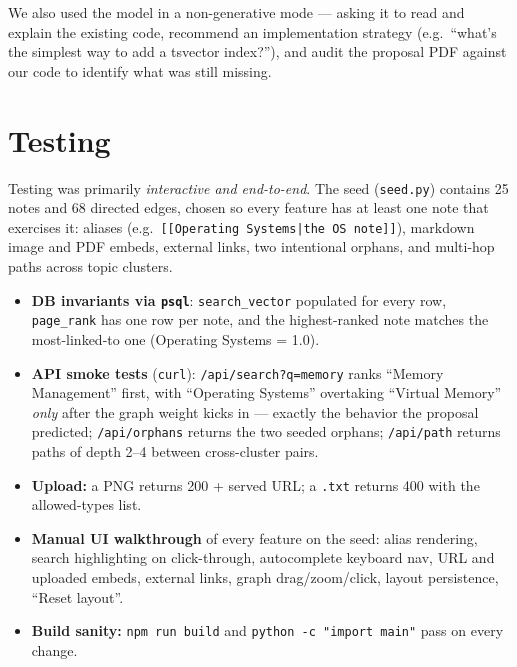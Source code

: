 \documentclass[11pt,a4paper]{article}
\begin{document}
We also used the model in a non-generative mode --- asking it to read and explain the existing code, recommend an implementation strategy (e.g.\ ``what's the simplest way to add a tsvector index?''), and audit the proposal PDF against our code to identify what was still missing.

\section{Testing}

Testing was primarily \emph{interactive and end-to-end}. The seed (\texttt{seed.py}) contains 25 notes and 68 directed edges, chosen so every feature has at least one note that exercises it: aliases (e.g.\ \texttt{[[Operating Systems|the OS note]]}), markdown image and PDF embeds, external links, two intentional orphans, and multi-hop paths across topic clusters.

\begin{itemize}[leftmargin=1.2em,itemsep=1pt,topsep=2pt]
\item \textbf{DB invariants via \texttt{psql}}: \texttt{search\_vector} populated for every row, \texttt{page\_rank} has one row per note, and the highest-ranked note matches the most-linked-to one (Operating Systems = 1.0).
\item \textbf{API smoke tests} (\texttt{curl}): \texttt{/api/search?q=memory} ranks ``Memory Management'' first, with ``Operating Systems'' overtaking ``Virtual Memory'' \emph{only} after the graph weight kicks in --- exactly the behavior the proposal predicted; \texttt{/api/orphans} returns the two seeded orphans; \texttt{/api/path} returns paths of depth 2--4 between cross-cluster pairs.
\item \textbf{Upload:} a PNG returns 200 + served URL; a \texttt{.txt} returns 400 with the allowed-types list.
\item \textbf{Manual UI walkthrough} of every feature on the seed: alias rendering, search highlighting on click-through, autocomplete keyboard nav, URL and uploaded embeds, external links, graph drag/zoom/click, layout persistence, ``Reset layout''.
\item \textbf{Build sanity:} \texttt{npm run build} and \texttt{python -c "import main"} pass on every change.
\end{itemize}

\end{document}
